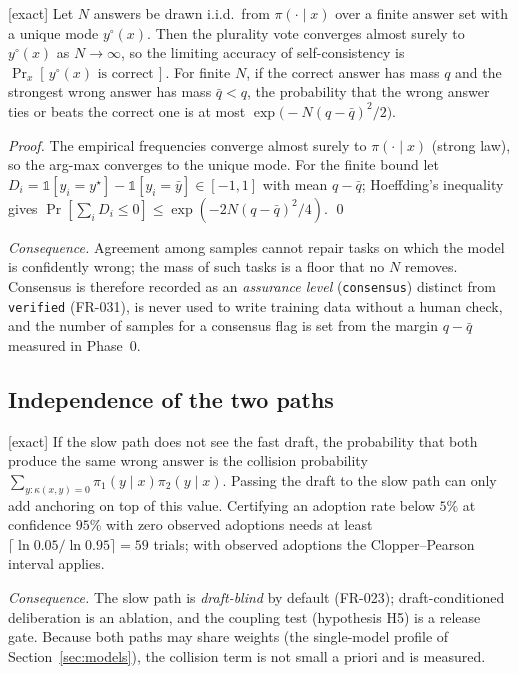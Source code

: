 \begin{theorem}
\textnormal{[exact]}
\label{thm:plurality}
Let $N$ answers be drawn i.i.d.\ from $\pi(\cdot\mid x)$ over a finite answer
set with a unique mode $y^\circ(x)$. Then the plurality vote converges almost
surely to $y^\circ(x)$ as $N\to\infty$, so the limiting accuracy of
self-consistency is $\Pr_x[\,y^\circ(x)\text{ is correct}\,]$. For finite $N$,
if the correct answer has mass $q$ and the strongest wrong answer has mass
$\bar q<q$, the probability that the wrong answer ties or beats the correct one
is at most $\exp\!\big(-N(q-\bar q)^2/2\big)$.
\end{theorem}
\begin{proof}
The empirical frequencies converge almost surely to $\pi(\cdot\mid x)$
(strong law), so the arg-max converges to the unique mode. For the finite
bound let $D_i=\mathbb 1[y_i=y^\star]-\mathbb 1[y_i=\bar y]\in[-1,1]$ with mean
$q-\bar q$; Hoeffding's inequality \cite{hoeffding1963} gives
$\Pr[\sum_iD_i\le0]\le\exp(-2N(q-\bar q)^2/4)$. \qed
\end{proof}
\emph{Consequence.} Agreement among samples cannot repair tasks on which the
model is confidently wrong; the mass of such tasks is a floor that no $N$
removes. Consensus is therefore recorded as an \emph{assurance level}
(\texttt{consensus}) distinct from \texttt{verified} (FR-031), is never used
to write training data without a human check, and the number of samples for a
consensus flag is set from the margin $q-\bar q$ measured in Phase~0.

\subsection{Independence of the two paths}

\begin{proposition} \textnormal{[exact]}
\label{prop:collision}
If the slow path does not see the fast draft, the probability that both
produce the same wrong answer is the collision probability
$\sum_{y:\kappa(x,y)=0}\pi_1(y\mid x)\pi_2(y\mid x)$. Passing the draft to the
slow path can only add anchoring on top of this value. Certifying an adoption
rate below $5\%$ at confidence $95\%$ with zero observed adoptions needs at
least $\lceil\ln0.05/\ln0.95\rceil=59$ trials; with observed adoptions the
Clopper--Pearson interval \cite{clopper1934} applies.
\end{proposition}
\emph{Consequence.} The slow path is \emph{draft-blind} by default
(FR-023); draft-conditioned deliberation is an ablation, and the coupling test
(hypothesis H5) is a release gate. Because both paths may share weights (the
single-model profile of Section~\ref{sec:models}), the collision term is not
small a priori and is measured.

